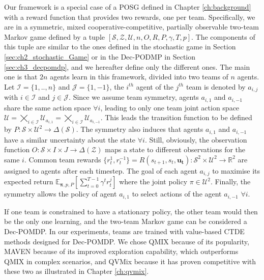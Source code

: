 Our framework is a special case of a POSG defined in Chapter \ref{ch:background} with a reward function that provides two rewards, one per team.
Specifically, we are in a symmetric, mixed cooperative-competitive, partially observable two-team Markov game defined by a tuple $[\mathcal{S}, \mathcal{Z}, \mathcal{U}, n, O, R, P, \gamma, T, p]$.
The components of this tuple are similar to the ones defined in the stochastic game in Section \ref{sec:ch2_stochastic_Game} or in the Dec-PODMP in Section \ref{sec:ch3_decpomdp}, and we hereafter define only the different ones.
The main one is that $2n$ agents learn in this framework, divided into two teams of $n$ agents.
Let $\mathcal{I}=\{1,..,n\}$ and $\mathcal{J}=\{1,-1\}$, the $i^{th}$ agent of the $j^{th}$ team is denoted by $a_{i, j}$ with $i \in \mathcal{I}$ and $ j \in \mathcal{J}$.
Since we assume team symmetry, agents $a_{i, 1}$ and $a_{i, -1}$ share the same action space $\forall i$, leading to only one team joint action space $\mathcal{U}=\bigtimes_{i\in \mathcal{I}} \mathcal{U}_{{a_{i, 1}}} = \bigtimes_{i\in \mathcal{I}} 
\mathcal{U}_{{a_{i, -1}}}$.
This leads the transition function to be defined by $P: \mathcal{S} \times \mathcal{U}^2 \rightarrow \Delta(\mathcal{S})$.
The symmetry also induces that agents $a_{i, 1}$ and $a_{i, -1}$ have a similar uncertainty about the state $\forall i$.
Still, obviously, the observation function $O: \mathcal{S} \times I \times J \rightarrow \Delta(\mathcal{Z})$ maps a state to different observations for the same $i$.
Common team rewards $\{r_t^1, r_t^{-1}\} = R(s_{t+1}, s_t, \mathbf{u_t}): \mathcal{S}^2 \times \mathcal{U}^2 \rightarrow \mathbb{R}^2$ are assigned to agents after each timestep.
The goal of each agent $a_{i, j}$ to maximise its expected return $\mathbb{E}_{\mathbf{\pi}, p, P}\left[ \sum_{t=0}^{T-1} \gamma^t r^{j}_t \right]$ where the joint policy $\pi \in \mathcal{U}^2$.
Finally, the symmetry allows the policy of agent $a_{i, 1}$ to select actions of the agent $a_{i, -1}$ $\forall i$.

If one team is constrained to have a stationary policy, the other team would then be the only one learning, and the two-team Markov game can be considered a Dec-POMDP.
In our experiments, teams are trained with value-based CTDE methods designed for Dec-POMDP.
We chose QMIX because of its popularity, MAVEN because of its improved exploration capability, which outperforms QMIX in complex scenarios, and QVMix because it has proven competitive with these two as illustrated in Chapter \ref{ch:qvmix}.

